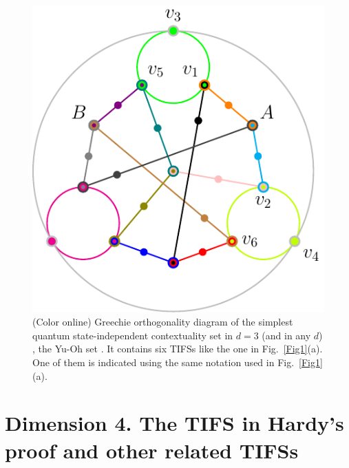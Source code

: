 \documentclass[%
 twocolumn,
 groupedaddress,
 showpacs,
 showkeys,
 preprintnumbers,
 amsmath,amssymb,
 aps,
 pra,
 longbibliography,
 floatfix,
 ]{revtex4-1}
\begin{document}

\begin{figure}
	\centerline{\includegraphics[width=0.78\columnwidth]{2018-minimalYIYS_pra_15REVISEDJR-Fig3.pdf}}
	\caption{\label{FigYuOh} (Color online) Greechie orthogonality diagram of the simplest quantum state-independent contextuality set in $d=3$ (and in any $d$) \cite{CKP16}, the Yu-Oh set \cite{YO12}. It contains six TIFSs like the one in Fig.\ \ref{Fig1}(a). One of them is indicated using the same notation used in Fig.\ \ref{Fig1}(a).}
\end{figure}


\section{Dimension 4. The TIFS in Hardy's proof and other related TIFSs}

\end{document}
